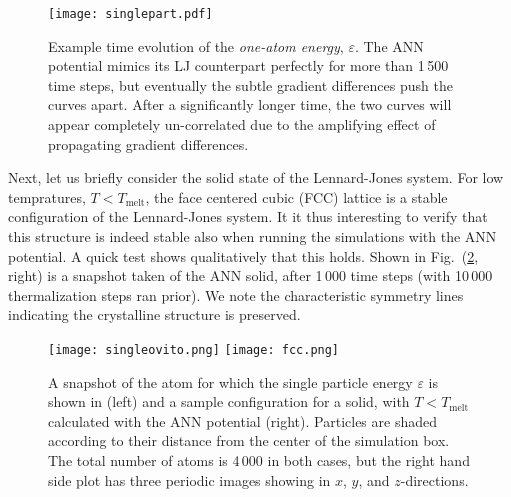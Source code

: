 \documentclass[../../master.tex]{subfiles}
\begin{document}
\begin{figure}[p]
\centering
\texttt{[image: singlepart.pdf]}
\caption{Example time evolution of the \emph{one-atom energy}, $\varepsilon$. The ANN potential mimics its LJ counterpart perfectly for more than 1\,500 time steps, but eventually the subtle gradient differences push the curves apart. After a significantly longer time, the two curves will appear completely un-correlated due to the amplifying effect of propagating gradient differences.  \label{fig:singlepart}}
\end{figure}

Next, let us briefly consider the solid state of the Lennard-Jones system. For low tempratures, $T<T_\text{melt}$, the face centered cubic (FCC) lattice is a stable configuration of the Lennard-Jones system. It it thus interesting to verify that this structure is indeed stable also when running the simulations with the ANN potential. A quick test shows qualitatively that this holds. Shown in Fig.\ (\ref{fig:singleovito}, right) is a snapshot taken of the ANN solid, after 1\,000 time steps (with 10\,000 thermalization steps ran prior). We note the characteristic symmetry lines indicating the crystalline structure is preserved.



\begin{figure}[p]
\centering
\texttt{[image: singleovito.png]}
\texttt{[image: fcc.png]}
\caption{A snapshot of the atom for which the single particle energy $\varepsilon$ is shown in  (left) and a sample configuration for a solid, with $T<T_\text{melt}$ calculated with the ANN potential (right). Particles are shaded according to their distance from the center of the simulation box. The total number of atoms is 4\,000 in both cases, but the right hand side plot has three periodic images showing in $x$, $y$, and $z$-directions. \label{fig:singleovito}}
\end{figure}
\end{document}
